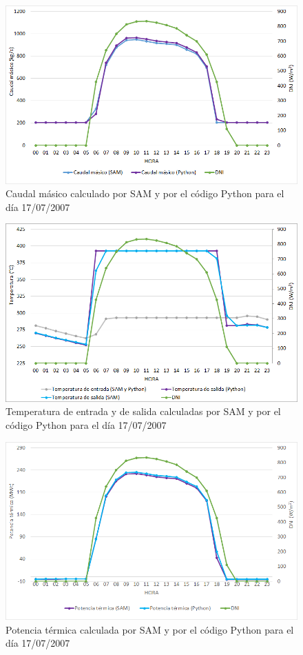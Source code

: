 \begin{figure}[H]
\includegraphics[width=0.9\linewidth]{images/177caudal.png}
\caption{Caudal másico calculado por SAM y por el código Python para el día 17/07/2007} 
\label{fig:177caudal}
\end{figure}

\begin{figure}[H]
\includegraphics[width=0.9\linewidth]{images/177temperatura.png}
\caption{Temperatura de entrada y de salida calculadas por SAM y por el código Python para el día 17/07/2007} 
\label{fig:177temperatura}
\end{figure}

\begin{figure}[H]
\includegraphics[width=0.9\linewidth]{images/177potencia.png}
\caption{Potencia térmica calculada por SAM y por el código Python para el día 17/07/2007} 
\label{fig:177potencia}
\end{figure}

